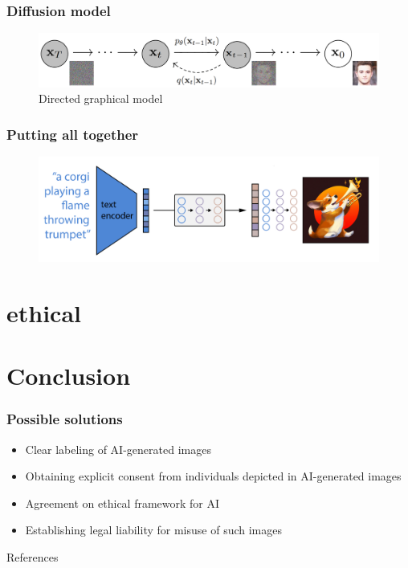 \documentclass[
	11pt, compress%
]{beamer}
\begin{document}
\begin{frame}
	\frametitle{Diffusion model}
	\begin{figure}
		\includegraphics[width=0.83\linewidth]{Images/diffusionModel.png}
		\caption{Directed graphical model \cite{DBLP:journals/corr/abs-2006-11239}}
	\end{figure}
\end{frame}


\begin{frame}
	\frametitle{Putting all together}
	\begin{figure}
		\includegraphics[width=0.85\linewidth]{Images/highLevel.png}
		\cite{https://doi.org/10.48550/arxiv.2204.06125}
	\end{figure}
\end{frame}



\section{ethical}

\section{Conclusion}

\begin{frame}
	\frametitle{Possible solutions}
	\begin{itemize}
		\item Clear labeling of AI-generated images
		\item Obtaining explicit consent from individuals depicted in AI-generated images
		\item Agreement on ethical framework for AI
		\item Establishing legal liability for misuse of such images
	\end{itemize}
\end{frame}


\begin{frame}[allowframebreaks]{References} 
    \nocite{*}
    
    
\end{frame}


\end{document}
